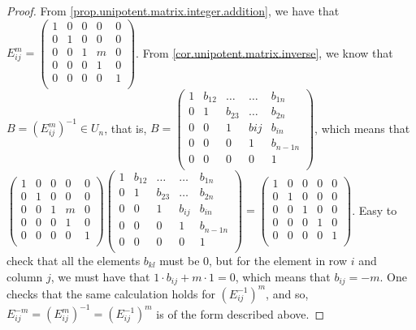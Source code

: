 \documentclass[12pt]{article}
\begin{document}
\begin{proof}
From \ref{prop.unipotent.matrix.integer.addition}, we have that $E_{ij}^m=\begin{pmatrix}
1 & 0 & 0 & 0 & 0\\
0 & 1 & 0 & 0 & 0\\
0 & 0 & 1 & m & 0\\
0 & 0 & 0 & 1 & 0\\
0 & 0 & 0 & 0 & 1\\
\end{pmatrix}$. 
From \ref{cor.unipotent.matrix.inverse}, we know that $B=(E_{ij}^m)^{-1}\in U_n$, that is, $B=\begin{pmatrix}
1 & b_{12} & \dots & \dots & b_{1n}\\
0 & 1 & b_{23} & \dots & b_{2n}\\
0 & 0 & 1 & bij & b_{in}\\
0 & 0 & 0 & 1 & b_{n-1n}\\
0 & 0 & 0 & 0 & 1\\
\end{pmatrix}$, which means that
$\begin{pmatrix}
1 & 0 & 0 & 0 & 0\\
0 & 1 & 0 & 0 & 0\\
0 & 0 & 1 & m & 0\\
0 & 0 & 0 & 1 & 0\\
0 & 0 & 0 & 0 & 1\\
\end{pmatrix}\begin{pmatrix}
1 & b_{12} & \dots & \dots & b_{1n}\\
0 & 1 & b_{23} & \dots & b_{2n}\\
0 & 0 & 1 & b_{ij} & b_{in}\\
0 & 0 & 0 & 1 & b_{n-1n}\\
0 & 0 & 0 & 0 & 1\\
\end{pmatrix}=\begin{pmatrix}
1 & 0 & 0 & 0 & 0\\
0 & 1 & 0 & 0 & 0\\
0 & 0 & 1 & 0 & 0\\
0 & 0 & 0 & 1 & 0\\
0 & 0 & 0 & 0 & 1\\
\end{pmatrix}$. Easy to check that all the elements $b_{kl}$ must be $0$, but for the element in row $i$ and column $j$, we must have that $1\cdot b_{ij}+m\cdot 1=0$, which means that $b_{ij}=-m$. One checks that the same calculation holds for $(E_{ij}^{-1})^m$, and so, $E_{ij}^{-m}=(E_{ij}^m)^{-1}=(E_{ij}^{-1})^m$ is of the form described above.
\end{proof}
\end{document}
